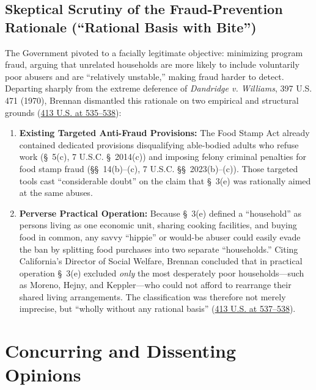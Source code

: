 \documentclass[12pt]{article}
\begin{document}
\subsection{Skeptical Scrutiny of the Fraud-Prevention Rationale (``Rational Basis with Bite'')}

The Government pivoted to a facially legitimate objective: minimizing program fraud, arguing that unrelated households are more likely to include voluntarily poor abusers and are ``relatively unstable,'' making fraud harder to detect. Departing sharply from the extreme deference of \textit{Dandridge v. Williams}, 397 U.S. 471 (1970), Brennan dismantled this rationale on two empirical and structural grounds (\href{https://supreme.justia.com/cases/federal/us/413/528/}{413 U.S. at 535--538}):
\begin{enumerate}
  \item \textbf{Existing Targeted Anti-Fraud Provisions:} The Food Stamp Act already contained dedicated provisions disqualifying able-bodied adults who refuse work (\S~5(c), 7 U.S.C. \S~2014(c)) and imposing felony criminal penalties for food stamp fraud (\S\S~14(b)--(c), 7 U.S.C. \S\S~2023(b)--(c)). Those targeted tools cast ``considerable doubt'' on the claim that \S~3(e) was rationally aimed at the same abuses.
  \item \textbf{Perverse Practical Operation:} Because \S~3(e) defined a ``household'' as persons living as one economic unit, sharing cooking facilities, and buying food in common, any savvy ``hippie'' or would-be abuser could easily evade the ban by splitting food purchases into two separate ``households.'' Citing California's Director of Social Welfare, Brennan concluded that in practical operation \S~3(e) excluded \textit{only} the most desperately poor households---such as Moreno, Hejny, and Keppler---who could not afford to rearrange their shared living arrangements. The classification was therefore not merely imprecise, but ``wholly without any rational basis'' (\href{https://supreme.justia.com/cases/federal/us/413/528/}{413 U.S. at 537--538}).
\end{enumerate}

\section{Concurring and Dissenting Opinions}
\end{document}
